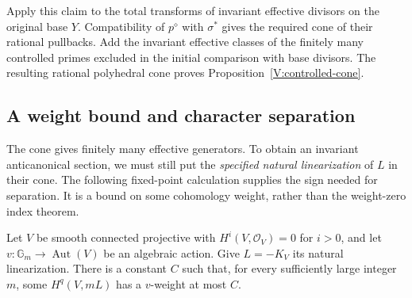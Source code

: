 Apply this claim to the total transforms of invariant effective
divisors on the original base $Y$.  Compatibility of $p^\diamond$
with $\sigma^*$ gives the required cone of their rational pullbacks.
Add the invariant effective classes of the finitely many controlled
primes excluded in the initial comparison with base divisors.  The
resulting rational polyhedral cone proves
Proposition~\ref{V:controlled-cone}.

\subsection{A weight bound and character separation}

The cone gives finitely many effective generators.  To obtain an
invariant anticanonical section, we must still put the \emph{specified
natural linearization} of $L$ in their cone.  The following fixed-point
calculation supplies the sign needed for separation.  It is a bound on
some cohomology weight, rather than the weight-zero index theorem.

\begin{lemma}\label{V:bounded-above-weight}
Let $V$ be smooth connected projective with
$H^i(V,\mathcal O_V)=0$ for $i>0$, and let
$v:\mathbb G_m\to\operatorname{Aut}(V)$ be an algebraic action.
Give $L=-K_V$ its natural linearization.  There is a constant $C$ such
that, for every sufficiently large integer $m$, some
$H^q(V,mL)$ has a $v$-weight at most $C$.
\end{lemma}

